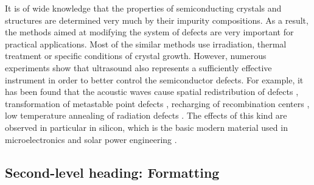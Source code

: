 \documentclass[%
 aip,
 amsmath,amssymb,
 reprint,%
]{revtex4-1}
\begin{document}
It is of wide knowledge that the properties of semiconducting crystals and structures are determined very much by their impurity compositions.
As a result, the methods aimed at modifying the system of defects are very important for practical applications. 
Most of the similar methods use irradiation, thermal treatment or specific conditions of crystal growth.
However, numerous experiments show that ultrasound also represents a sufficiently effective instrument in order to better control the semiconductor defects. 
For example, it has been found that the acoustic waves cause 
spatial redistribution of defects \cite{Roman:2010JAP,GORB2020,Ostapenko1999,Zaveryukhin2002,Zaver:2008,OstapSC}, 
transformation of metastable point defects \cite{buyanova1994,Ostrovskii2001,Wosinski}, 
recharging of recombination centers \cite{Olikh:Ultras,Korotchenkov1995}, 
low temperature annealing of radiation defects \cite{Podolian2012,YOlikh2006TPL,UST:OstrovCsI,Parchinskii2006,UST:LED_SM}. 
The effects of this kind are observed in particular in silicon, which is the basic modern material used in microelectronics and solar power engineering \cite{Roman:2010JAP,GORB2020,Zaver:2008,Roman:2007APL,OlikhJAP,Ostrovskii2001,Podolian2012,Parchinskii2006}.


%
%

\subsection{\label{sec:level2}Second-level heading: Formatting}
\end{document}

